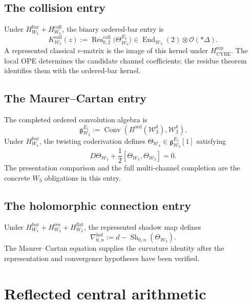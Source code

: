 \subsection{The collision entry}
\label{subsec:w3hol-r}

Under \(H_{W_3}^{\mathrm{bar}}+H_{W_3}^{\mathrm{coll}}\), the binary
ordered-bar entry is
\begin{equation}\label{eq:w3hol-r-collision}
K_{\mathcal W_3}^{\mathrm{coll}}(z)
:=
\operatorname{Res}_{0,2}^{\mathrm{coll}}
\bigl(\Theta_{\mathcal W_3}^{E_1}\bigr)
\in
\operatorname{End}_{\mathcal W_3}(2)\otimes\mathcal O(*\Delta).
\end{equation}
A represented classical \(r\)-matrix is the image of this kernel
under \(H_{\mathrm{CYBE}}^{\mathrm{rep}}\).  The local OPE determines
the candidate channel coefficients; the residue theorem identifies
them with the ordered-bar kernel.

\subsection{The Maurer--Cartan entry}
\label{subsec:w3hol-Theta}

The completed ordered convolution algebra is
\[
\mathfrak g_{\mathcal W_3}^{E_1}
:=
\operatorname{Conv}\!\left(
B^{\mathrm{ord}}(\mathcal W_3^k),\mathcal W_3^k
\right).
\]
Under \(H_{W_3}^{\mathrm{bar}}\), the twisting coderivation defines
\(\Theta_{\mathcal W_3}\in\mathfrak g_{\mathcal W_3}^{E_1}[1]\)
satisfying
\[
D\Theta_{\mathcal W_3}
+\frac12[\Theta_{\mathcal W_3},\Theta_{\mathcal W_3}]=0.
\]
The presentation comparison and the full multi-channel completion are
the concrete \(W_3\) obligations in this entry.

\subsection{The holomorphic connection entry}
\label{subsec:w3hol-nabla}

Under
\(H_{W_3}^{\mathrm{bar}}+H_{W_3}^{\mathrm{res}}
+H_{W_3}^{\mathrm{flat}}\), the represented shadow map defines
\begin{equation}\label{eq:w3hol-shadow-connection}
\nabla_{0,n}^{\mathrm{hol}}
:=
d-\operatorname{Sh}_{0,n}(\Theta_{\mathcal W_3}).
\end{equation}
The Maurer--Cartan equation supplies the curvature identity after the
representation and convergence hypotheses have been verified.

\section{Reflected central arithmetic}
\label{sec:w3hol-complementarity}

